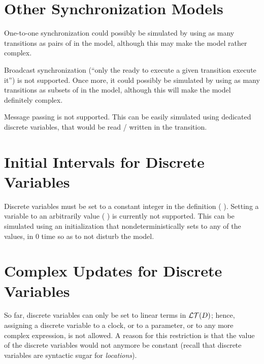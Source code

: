 \section{Other Synchronization Models}

One-to-one synchronization could possibly be simulated by using as many transitions as pairs of \IPTA{} in the model, although this may make the model rather complex.



Broadcast synchronization (``only the \IPTA{} ready to execute a given transition execute it'') is not supported.
Once more, it could possibly be simulated by using as many transitions as subsets of \IPTA{} in the model, although this will make the model definitely complex.



Message passing is not supported.
This can be easily simulated using dedicated discrete variables, that would be read / written in the transition.



\section{Initial Intervals for Discrete Variables}

Discrete variables must be set to a constant integer in the  definition (\eg{} ).
Setting a variable to an arbitrarily value (\eg{} ) is currently not supported.
This can be simulated using an initialization \IPTA{} that nondeterministically sets  to any of the values, in 0 time so as to not disturb the model.


\section{Complex Updates for Discrete Variables}

So far, discrete variables can only be set to linear terms in $\mathcal{LT}(D)$;
hence, assigning a discrete variable to a clock, or to a parameter, or to any more complex expression, is not allowed.
A reason for this restriction is that the value of the discrete variables would not anymore be constant (recall that discrete variables are syntactic sugar for \emph{locations}).

